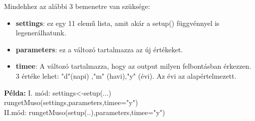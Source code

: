 \documentclass[12pt,a4paper]{article}
\begin{document}
Mindehhez az alábbi 3 bemenetre van szüksége:

\begin{itemize}
\item \textbf{settings}: ez egy 11 elemű lista, amit akár a setup() függvénnyel is legenerálhatunk.
\item \textbf{parameters}: ez a változó tartalmazza az új értékeket.
\item \textbf{timee}: A változó tartalmazza, hogy az output milyen felbontásban érkezzen. 3 értéke lehet: "d"(napi) ,"m" (havi),"y" (évi). Az évi az alapértelmezett.
\end{itemize}

\textbf{Példa:}\newline \newline
I. mód:\newline
settings<-setup(...)\\
rungetMuso(settings,parameters,timee="y")\\
II.mód:\newline
rungetMuso(setup(..),parameters,timee="y")
\end{document}
